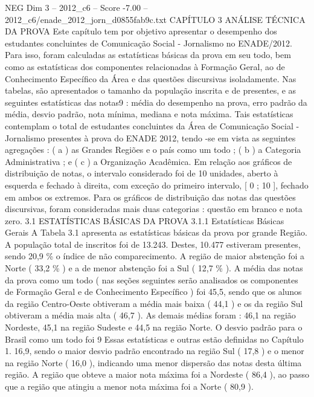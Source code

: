 \begin{textsample}{NEG Dim 3 – 2012\_c6 – Score -7.00 – 2012\_c6/enade\_2012\_jorn\_d0855fab9c.txt}  \label{ex:f3_neg_025}
CAPÍTULO 3 ANÁLISE TÉCNICA DA PROVA Este capítulo tem por objetivo apresentar o desempenho dos estudantes concluintes de Comunicação Social - Jornalismo no ENADE/2012.
Para isso, foram calculadas as estatísticas básicas da prova em seu todo, bem como as estatísticas dos componentes relacionadas à Formação Geral, ao de Conhecimento Específico da Área e das questões discursivas isoladamente.
Nas tabelas, são apresentados o tamanho da população inscrita e de presentes, e as seguintes estatísticas das notas9 : média do desempenho na prova, erro padrão da média, desvio padrão, nota mínima, mediana e nota máxima.
Tais estatísticas contemplam o total de estudantes concluintes da Área de Comunicação Social - Jornalismo presentes à prova do ENADE 2012, tendo -se em vista as seguintes agregações : ( a ) as Grandes Regiões e o país como um todo ; ( b ) a Categoria Administrativa ; e ( c ) a Organização Acadêmica.
Em relação aos gráficos de distribuição de notas, o intervalo considerado foi de 10 unidades, aberto à esquerda e fechado à direita, com exceção do primeiro intervalo, [ 0 ; 10 ], fechado em ambos os extremos.
Para os gráficos de distribuição das notas das questões discursivas, foram consideradas mais duas categorias : questão em branco e nota zero. 3.1 ESTATÍSTICAS BÁSICAS DA PROVA 3.1.1 Estatísticas Básicas Gerais A Tabela 3.1 apresenta as estatísticas básicas da prova por grande Região.
A população total de inscritos foi de 13.243.
Destes, 10.477 estiveram presentes, sendo 20,9 \% o índice de não comparecimento.
A região de maior abstenção foi a Norte ( 33,2 \% ) e a de menor abstenção foi a Sul ( 12,7 \% ).
A média das notas da prova como um todo ( nas seções seguintes serão analisados os componentes de Formação Geral e de Conhecimento Específico ) foi 45,5, sendo que os alunos da região Centro-Oeste obtiveram a média mais baixa ( 44,1 ) e os da região Sul obtiveram a média mais alta ( 46,7 ).
As demais médias foram : 46,1 na região Nordeste, 45,1 na região Sudeste e 44,5 na região Norte.
O desvio padrão para o Brasil como um todo foi 9 Essas estatísticas e outras estão definidas no Capítulo 1. 16,9, sendo o maior desvio padrão encontrado na região Sul ( 17,8 ) e o menor na região Norte ( 16,0 ), indicando uma menor dispersão das notas desta última região.
A região que obteve a maior nota máxima foi a Nordeste ( 86,4 ), ao passo que a região que atingiu a menor nota máxima foi a Norte ( 80,9 ).

\end{textsample}
